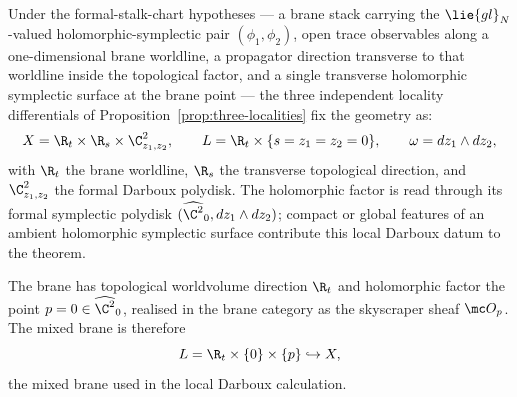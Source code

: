 \documentclass[11pt]{memoir}
\begin{document}
Under the formal-stalk-chart hypotheses --- a brane stack carrying the
\(\lie{gl}_N\)-valued holomorphic-symplectic pair
\((\phi_1,\phi_2)\), open trace observables along a one-dimensional
brane worldline, a propagator direction transverse to that worldline
inside the topological factor, and a single transverse holomorphic
symplectic surface at the brane point --- the three independent
locality differentials of
Proposition~\ref{prop:three-localities} fix the geometry as:
\begin{equation}\label{eq:setup-X-L}
  X=\R_t\times\R_s\times\C^2_{z_1,z_2},\qquad
  L=\R_t\times\{s=z_1=z_2=0\},\qquad
  \omega=dz_1\wedge dz_2,
\end{equation}
with \(\R_t\) the brane worldline, \(\R_s\) the transverse topological
direction, and \(\C^2_{z_1,z_2}\) the formal Darboux polydisk. The
holomorphic factor is read through its formal symplectic polydisk
\((\widehat{\C^2}_0,dz_1\wedge dz_2)\); compact or global features of an
ambient holomorphic symplectic surface contribute this local Darboux
datum to the theorem.

The brane has topological worldvolume direction \(\R_t\) and
holomorphic factor the point
\(p=0\in\widehat{\C^2}_0\), realised in the brane category as the
skyscraper sheaf \(\mc O_p\). The mixed brane is therefore
\[
  L=\R_t\times\{0\}\times\{p\}\hookrightarrow X,
\]
the mixed brane used in the local Darboux calculation.
\end{document}
